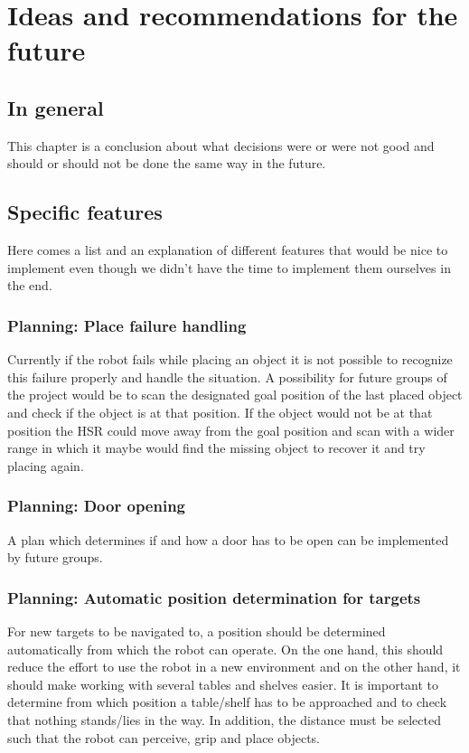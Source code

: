 \documentclass[main.tex]{subfiles}
\begin{document}
	\begingroup

	\renewcommand{\cleardoublepage}{}

	\renewcommand{\clearpage}{}

	\chapter{Ideas and recommendations for the future}
		
		\section{In general}
				\chapterauthor{}
		This chapter is a conclusion about what decisions were or were not good and should or should not be done the same way in the future.
		
		\section{Specific features}
		Here comes a list and an explanation of different features that would be nice to implement even though we didn't have the time to implement them ourselves in the end.
		
		\subsection{Planning: Place failure handling}
		Currently if the robot fails while placing an object it is not possible to recognize this failure properly and handle the situation. A possibility for future groups of the project would be to scan the designated goal position of the last placed object and check if the object is at that position. If the object would not be at that position the HSR could move away from the goal position and scan with a wider range in which it maybe would find the missing object to recover it and try placing again.
		
		\subsection{Planning: Door opening}
		A plan which determines if and how a door has to be open can be implemented by future groups.
		
		\subsection{Planning: Automatic position determination for targets}
		For new targets to be navigated to, a position should be determined automatically from which the robot can operate. On the one hand, this should reduce the effort to use the robot in a new environment and on the other hand, it should make working with several tables and shelves easier. It is important to determine from which position a table/shelf has to be approached and to check that nothing stands/lies in the way. In addition, the distance must be selected such that the robot can perceive, grip and place objects.
		
\end{document}
